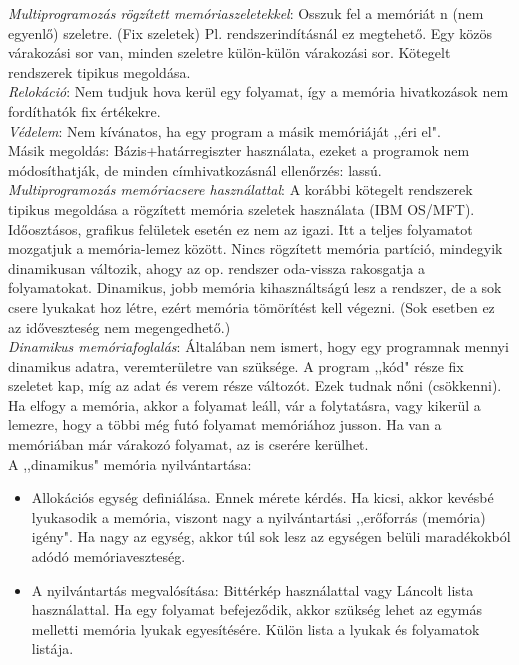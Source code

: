 \documentclass[margin=0px]{article}
\begin{document}
\textit{Multiprogramozás rögzített memóriaszeletekkel}: Osszuk fel a memóriát n (nem egyenlő) szeletre. (Fix szeletek) Pl. rendszerindításnál ez megtehető. Egy közös várakozási sor van, minden szeletre külön-külön várakozási sor. Kötegelt rendszerek tipikus megoldása. \\
\textit{Relokáció}: Nem tudjuk hova kerül egy folyamat, így a memória hivatkozások nem fordíthatók fix értékekre. \\
\textit{Védelem}: Nem kívánatos, ha egy program a másik memóriáját ,,éri el". \\
Másik megoldás: Bázis+határregiszter használata, ezeket a programok nem módosíthatják, de minden címhivatkozásnál ellenőrzés: lassú. \\
\textit{Multiprogramozás memóriacsere használattal}: A korábbi kötegelt rendszerek tipikus megoldása a	rögzített memória szeletek használata (IBM OS/MFT). Időosztásos, grafikus felületek esetén ez nem az igazi. Itt a teljes folyamatot mozgatjuk a memória-lemez között. Nincs rögzített memória partíció, mindegyik	dinamikusan változik, ahogy az op. rendszer oda-vissza rakosgatja a folyamatokat. Dinamikus, jobb memória kihasználtságú lesz a rendszer, de a sok csere lyukakat hoz létre, ezért memória tömörítést kell végezni. (Sok esetben ez az időveszteség nem megengedhető.) \\
\textit{Dinamikus memóriafoglalás}: Általában nem ismert, hogy egy programnak mennyi dinamikus adatra, veremterületre van szüksége. A program ,,kód" része fix szeletet kap, míg az adat és verem része változót. Ezek tudnak nőni (csökkenni). Ha elfogy a memória, akkor a folyamat leáll, vár a
folytatásra, vagy kikerül a lemezre, hogy a többi még futó folyamat memóriához jusson. Ha van a memóriában már várakozó folyamat, az is cserére kerülhet. \\
A ,,dinamikus" memória nyilvántartása:
\begin{itemize}
    \item Allokációs egység definiálása. Ennek mérete kérdés. Ha kicsi, akkor kevésbé lyukasodik a memória, viszont nagy a nyilvántartási ,,erőforrás (memória) igény". Ha nagy az egység, akkor túl sok lesz az egységen belüli maradékokból adódó memóriaveszteség.
    \item A nyilvántartás megvalósítása: Bittérkép használattal vagy Láncolt lista használattal. Ha egy folyamat befejeződik, akkor szükség lehet az egymás melletti memória lyukak egyesítésére. Külön lista a lyukak és folyamatok listája.
\end{itemize}
\end{document}
